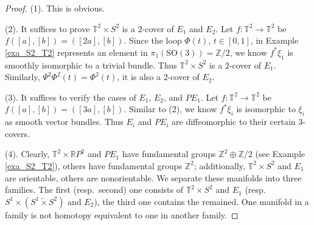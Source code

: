 \documentclass[12pt]{amsart}
\theoremstyle{plain}
\theoremstyle{definition}
\theoremstyle{question}
\theoremstyle{remark}
\theoremstyle{assumption}
\numberwithin{equation}{section}
\theoremstyle{bigthm}
\begin{document}
\begin{proof}
(1). This is obvious.

(2). It suffices to prove $\mathbb{T}^{2} \times S^{2}$ is a $2$-cover of $E_{1}$ and $E_{2}$. Let $f \colon  \mathbb{T}^{2} \rightarrow \mathbb{T}^{2}$ be $f([a],[b]) = ([2a],[b])$. Since the loop $\Phi (t)$, $t \in [0,1]$, in Example \ref{exa_S2_T2} represents an element in $\pi_{1} (\mathrm{SO}(3)) = \mathbb{Z}/2$, we know $f^{*} \xi_{1}$ is smoothly isomorphic to a trivial bundle. Thus $\mathbb{T}^{2} \times S^{2}$ is a $2$-cover of $E_{1}$. Similarly, $\Psi^{2} \Phi^{2} (t) = \Phi^{2} (t)$, it is also a $2$-cover of $E_{2}$.

(3). It suffices to verify the cases of $E_{1}$, $E_{2}$, and $PE_{1}$. Let $f \colon  \mathbb{T}^{2} \rightarrow \mathbb{T}^{2}$ be $f([a],[b]) = ([3a],[b])$. Similar to (2), we know $f^{*} \xi_{i}$ is isomorphic to $\xi_{i}$ as smooth vector bundles. Thus $E_{i}$ and $PE_{i}$ are diffeomorphic to their certain $3$-covers.

(4). Clearly, $\mathbb{T}^{2} \times \mathbb{R} P^{2}$ and $PE_{1}$ have fundamental groups $\mathbb{Z}^{2} \oplus \mathbb{Z}/2$ (see Example \ref{exa_S2_T2}), others have fundamental groups $\mathbb{Z}^{2}$; additionally, $\mathbb{T}^{2} \times S^{2}$ and $E_{1}$ are orientable, others are nonorientable. We separate these manifolds into three families. The first (resp.~second) one consists of $\mathbb{T}^{2} \times S^{2}$ and $E_{1}$ (resp.~$S^{1} \times (S^{1} \tilde{\times} S^{2})$ and $E_{2}$), the third one contains the remained. One manifold in a family is not homotopy equivalent to one in another family.


\end{proof}
\end{document}
